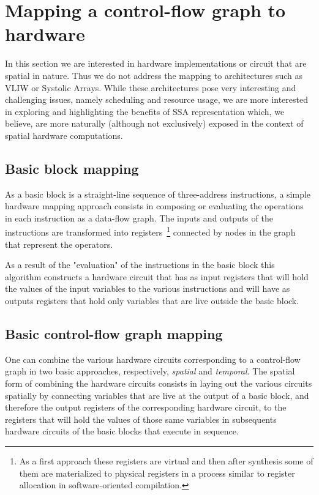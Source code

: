 \section{Mapping a control-flow graph to hardware}
In this section we are interested in hardware implementations or circuit that are spatial in nature.
Thus we do not address the mapping to architectures such as VLIW or Systolic Arrays. 
While these architectures pose very interesting and challenging issues, namely scheduling and resource usage, we are more interested in exploring and highlighting the benefits of SSA representation which, we believe, are more naturally (although not exclusively) exposed in the context of spatial hardware computations.

\subsection{Basic block mapping}
As a basic block is a straight-line sequence of three-address instructions, a simple hardware mapping approach consists in composing or evaluating the operations in each instruction as a data-flow graph. 
The inputs and outputs of the instructions are transformed into registers~\footnote{As a first approach these registers are virtual and then after synthesis some of them are materialized to physical registers in a process similar to register allocation in software-oriented compilation.} 
connected by nodes in the graph that represent the operators. 

As a result of the "evaluation" of the instructions in the basic block this algorithm constructs a hardware circuit that has as input registers that will hold the values of the input variables to the various instructions and will have as outputs registers that hold only variables that are live outside the basic block. 


\subsection{Basic control-flow graph mapping}
\label{sec:cfg_mapping}
One can combine the various hardware circuits corresponding to a control-flow graph in two basic approaches, respectively, {\em spatial} and {\em temporal}. 
The spatial form of combining the hardware circuits consists in laying out the various circuits spatially by connecting variables that are live at the output of a basic block, and therefore the output registers of the corresponding hardware circuit, to the registers that will hold the values of those same variables in subsequents hardware circuits of the basic blocks that execute in sequence.

